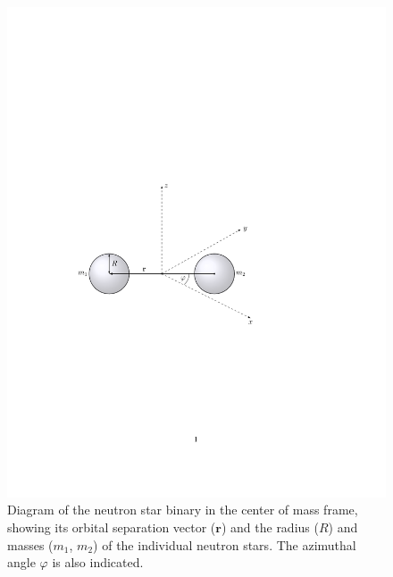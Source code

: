 \documentclass[11pt]{article}
\begin{document}
\begin{figure}[!h]
\begin{mdframed}
\centering
\includegraphics{relativistic_orbit/binary_diagram.pdf}
\caption{\label{fig:binary_diagram}Diagram of the neutron star binary in the center of mass frame, showing its orbital separation vector ($\mathbf{r}$) and the radius ($R$) and masses ($m_1$, $m_2$) of the individual neutron stars. The azimuthal angle $\varphi$ is also indicated.}
\end{mdframed}
\end{figure}

\vspace{1000pt}
\end{document}
